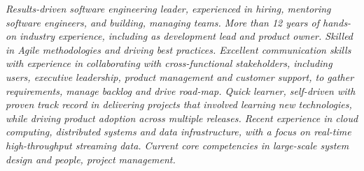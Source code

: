 {\selectfont
	\begin{justify}\textit{Results-driven software engineering leader, experienced in hiring, mentoring software engineers, and building, managing teams. More than 12 years of hands-on industry experience, including as development lead and product owner. Skilled in Agile methodologies and driving best practices. Excellent communication skills with experience in collaborating with cross-functional stakeholders, including users, executive leadership, product management and customer support, to gather requirements, manage backlog and drive road-map. Quick learner, self-driven with proven track record in delivering projects that involved learning new technologies, while driving product adoption across multiple releases. Recent experience in cloud computing, distributed systems and data infrastructure, with a focus on real-time high-throughput streaming data. Current core competencies in large-scale system design and people, project management.}\end{justify}
}